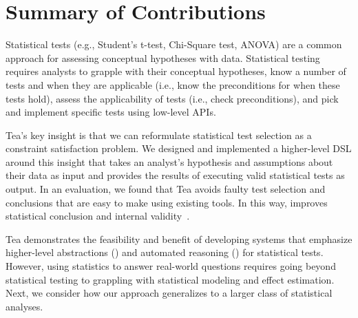 \begin{comment}
Second, a usability issue with Tea's current API is its reliance of ``magic
strings.'' We are currently refactoring the API to be more object-oriented by
extending Tisane's variables data classes. We hope this revision will be more
usable with ``free'' help from existing IDEs such as VSCode that provide API
suggestions inline when specifying parameters. 

Both features will be incorporated into a new release of Tea, which I have
currently scheduled for June, 2022. 
\end{comment}

\section{Summary of Contributions} \label{sec:summaryTea}



Statistical tests (e.g., Student's t-test, Chi-Square test, ANOVA) are a common
approach for assessing conceptual hypotheses with data.
Statistical testing requires analysts to grapple with their conceptual
hypotheses, know a number of tests and when they are applicable (i.e., know the
preconditions for when these tests hold), assess the applicability of tests
(i.e., check preconditions), and pick and implement specific tests using
low-level APIs. 

Tea's key insight is that we can reformulate statistical test
selection as a constraint satisfaction problem. We designed and implemented a
higher-level DSL around this insight that takes an analyst's hypothesis and
assumptions about their data as input and provides the results of executing
valid statistical tests as output. In an evaluation, we found that Tea avoids
faulty test selection and conclusions that are easy to make using existing
tools. In this way, \tea improves statistical conclusion and internal validity~\cite{shadish2010campbell}. 

Tea demonstrates the feasibility and benefit of developing systems that
emphasize higher-level abstractions (\thesisChallengeExplicit) and
automated reasoning (\thesisChallengeRep) for statistical tests.
However, using statistics to answer real-world questions requires going beyond
statistical testing to grappling with statistical modeling and effect
estimation. Next, we consider how our approach generalizes to a larger class of
statistical analyses. 

